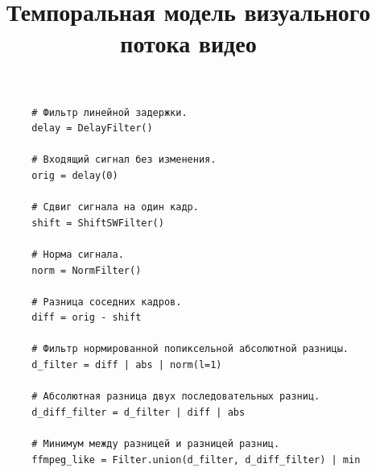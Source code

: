 \documentclass{.local/lib/classes/ndvr-vector-image-standalone}
\title[NDVR thesis-abstract]{%
    Темпоральная модель визуального потока видео%
}
\begin{document}
    \begin{verbatim}
        # Фильтр линейной задержки.
        delay = DelayFilter() 

        # Входящий сигнал без изменения.
        orig = delay(0)

        # Сдвиг сигнала на один кадр.
        shift = ShiftSWFilter() 
        
        # Норма сигнала.
        norm = NormFilter()

        # Разница соседних кадров.
        diff = orig - shift

        # Фильтр нормированной попиксельной абсолютной разницы.
        d_filter = diff | abs | norm(l=1)

        # Абсолютная разница двух последовательных разниц.
        d_diff_filter = d_filter | diff | abs

        # Минимум между разницей и разницей разниц.
        ffmpeg_like = Filter.union(d_filter, d_diff_filter) | min
    \end{verbatim}
\end{document}
